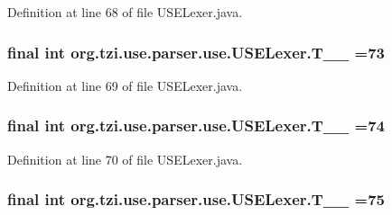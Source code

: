 Definition at line 68 of file U\-S\-E\-Lexer.\-java.

\hypertarget{classorg_1_1tzi_1_1use_1_1parser_1_1use_1_1_u_s_e_lexer_a4b7c5cd3c47374b8e2372db3b983d3e4}{
\subsubsection[{T\-\_\-\-\_\-73}]{\setlength{\rightskip}{0pt plus 5cm}final int org.\-tzi.\-use.\-parser.\-use.\-U\-S\-E\-Lexer.\-T\-\_\-\-\_ =73\hspace{0.3cm}{\ttfamily [static]}}}\label{classorg_1_1tzi_1_1use_1_1parser_1_1use_1_1_u_s_e_lexer_a4b7c5cd3c47374b8e2372db3b983d3e4}


Definition at line 69 of file U\-S\-E\-Lexer.\-java.

\hypertarget{classorg_1_1tzi_1_1use_1_1parser_1_1use_1_1_u_s_e_lexer_a0a7cf498acdd3d5a4ae8e5400893807b}{
\subsubsection[{T\-\_\-\-\_\-74}]{\setlength{\rightskip}{0pt plus 5cm}final int org.\-tzi.\-use.\-parser.\-use.\-U\-S\-E\-Lexer.\-T\-\_\-\-\_ =74\hspace{0.3cm}{\ttfamily [static]}}}\label{classorg_1_1tzi_1_1use_1_1parser_1_1use_1_1_u_s_e_lexer_a0a7cf498acdd3d5a4ae8e5400893807b}


Definition at line 70 of file U\-S\-E\-Lexer.\-java.

\hypertarget{classorg_1_1tzi_1_1use_1_1parser_1_1use_1_1_u_s_e_lexer_ac365a2cb01a9768e543f13bf3f20c287}{
\subsubsection[{T\-\_\-\-\_\-75}]{\setlength{\rightskip}{0pt plus 5cm}final int org.\-tzi.\-use.\-parser.\-use.\-U\-S\-E\-Lexer.\-T\-\_\-\-\_ =75\hspace{0.3cm}{\ttfamily [static]}}}\label{classorg_1_1tzi_1_1use_1_1parser_1_1use_1_1_u_s_e_lexer_ac365a2cb01a9768e543f13bf3f20c287}


